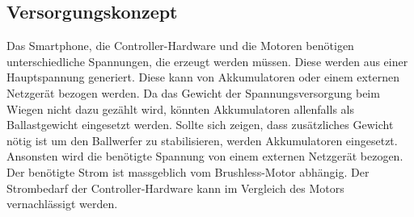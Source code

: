 \subsection{Versorgungskonzept}
	Das Smartphone, die Controller-Hardware und die Motoren benötigen unterschiedliche 
	Spannungen, die erzeugt werden müssen. Diese werden aus einer Hauptspannung generiert. 
	Diese kann von Akkumulatoren oder einem externen Netzgerät bezogen werden. Da das 
	Gewicht der Spannungsversorgung beim Wiegen nicht dazu gezählt wird, könnten Akkumulatoren 
	allenfalls als Ballastgewicht eingesetzt werden. Sollte sich zeigen, dass zusätzliches 
	Gewicht nötig ist um den Ballwerfer zu stabilisieren, werden Akkumulatoren eingesetzt. 
	Ansonsten wird die benötigte Spannung von einem externen Netzgerät bezogen. Der benötigte 
	Strom ist massgeblich vom Brushless-Motor abhängig. Der  Strombedarf der Controller-Hardware 
	kann im Vergleich des Motors vernachlässigt werden.